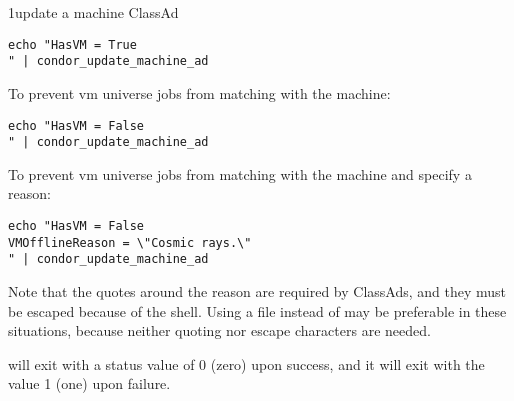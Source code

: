 \begin{ManPage}{}{1}{update a machine ClassAd}
\begin{verbatim}
echo "HasVM = True
" | condor_update_machine_ad
\end{verbatim}

To prevent vm universe jobs from matching with the machine:

\begin{verbatim}
echo "HasVM = False
" | condor_update_machine_ad
\end{verbatim}

To prevent vm universe jobs from matching with the machine
and specify a reason:

\begin{verbatim}
echo "HasVM = False
VMOfflineReason = \"Cosmic rays.\"
" | condor_update_machine_ad
\end{verbatim}

Note that the quotes around the reason are required by ClassAds, 
and they must be escaped because of the shell.
Using a file instead of  may be preferable
in these situations, 
because neither quoting nor escape characters are needed.

\ExitStatus

 will exit with a status value of 0 (zero) upon
success, and it will exit with the value 1 (one) upon failure.

\end{ManPage}
